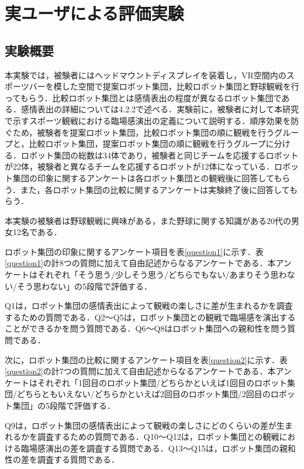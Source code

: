 \chapter{実ユーザによる評価実験}
\thispagestyle{fancy}
\lhead{}
\chead{}
\rhead{}
\lfoot{} 
\cfoot{\thepage}  
\rfoot{}
%

\section{実験概要}
\label{sec4.1}

本実験では，被験者にはヘッドマウントディスプレイを装着し，VR空間内のスポーツバーを模した空間で提案ロボット集団，比較ロボット集団と野球観戦を行ってもらう．比較ロボット集団とは感情表出の程度が異なるロボット集団である．感情表出の詳細については4.2.2で述べる．実験前に，被験者に対して本研究で示すスポーツ観戦における臨場感演出の定義について説明する．順序効果を防ぐため，被験者を提案ロボット集団，比較ロボット集団の順に観戦を行うグループと，比較ロボット集団，提案ロボット集団の順に観戦を行うグループに分ける．ロボット集団の総数は34体であり，被験者と同じチームを応援するロボットが22体，被験者と異なるチームを応援するロボットが12体になっている．ロボット集団の印象に関するアンケートは各ロボット集団との観戦後に回答してもらう．また，各ロボット集団の比較に関するアンケートは実験終了後に回答してもらう．

本実験の被験者は野球観戦に興味がある，また野球に関する知識がある20代の男女12名である．

ロボット集団の印象に関するアンケート項目を表\ref{question1}に示す．表\ref{question1}の計8つの質問に加えて自由記述からなるアンケートである．本アンケートはそれぞれ「そう思う/少しそう思う/どちらでもない/あまりそう思わない/そう思わない」の5段階で評価する．

Q1は，ロボット集団の感情表出によって観戦の楽しさに差が生まれるかを調査するための質問である．Q2～Q5は，ロボット集団との観戦で臨場感を演出することができるかを問う質問である．Q6～Q8はロボット集団への親和性を問う質問である．

次に，ロボット集団の比較に関するアンケート項目を表\ref{question2}に示す．表\ref{question2}の計7つの質問に加えて自由記述からなるアンケートである．本アンケートはそれぞれ「1回目のロボット集団/どちらかといえば1回目のロボット集団/どちらともいえない/どちらかといえば2回目のロボット集団/2回目のロボット集団」の5段階で評価する．

Q9は，ロボット集団の感情表出によって観戦の楽しさにどのくらいの差が生まれるかを調査するための質問である．Q10～Q12は，ロボット集団との観戦における臨場感演出の差を調査する質問である．Q13～Q15は，ロボット集団の親和性の差を調査する質問である．


